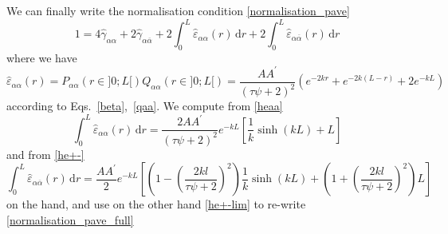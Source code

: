 \documentclass[pre,aps,superscriptaddress,nofootinbib]{revtex4}
\begin{document}
We can finally write the normalisation condition \eqref{normalisation_pave}
\begin{equation}
1 = 4 \hat{\gamma}_{\alpha\alpha} + 2 \hat{\gamma}_{\alpha\overline{\alpha}} + 2 \int_0^L \hat{\varepsilon}_{\alpha\alpha}(r) \, \mathrm{d}r + 2 \int_0^L \hat{\varepsilon}_{\alpha\overline{\alpha}}(r) \, \mathrm{d}r
\label{normalisation_pave_full}
\end{equation}
where we have
\begin{equation}
\hat{\varepsilon}_{\alpha\alpha}(r) = P_{\alpha\alpha}(r \in ]0; L[) Q_{\alpha\alpha}(r \in ]0; L[) = \frac{A A^{\prime}}{(\tau \psi + 2)^2} \left(e^{-2 k r} + e^{-2 k (L - r)} + 2 e^{-k L}\right)
\label{heaa}
\end{equation}
according to Eqs.~\ref{beta},~\ref{qaa}. We compute from \eqref{heaa}
\begin{equation}
\int_0^L \hat{\varepsilon}_{\alpha\alpha}(r) \, \mathrm{d}r = \frac{2 A A^{\prime}}{(\tau \psi + 2)^2} e^{-k L} \left[\frac{1}{k} \sinh(k L) + L\right]
\end{equation}
and from \eqref{he+-}
\begin{equation}
\int_0^L \hat{\varepsilon}_{\alpha\overline{\alpha}}(r) \, \mathrm{d}r = \frac{A A^{\prime}}{2} e^{-k L} \left[\left(1 - \left(\frac{2 k l}{\tau \psi + 2}\right)^2\right) \frac{1}{k} \sinh(k L) + \left(1 + \left(\frac{2 k l}{\tau \psi + 2}\right)^2\right) L\right]
\end{equation}
on the hand, and use on the other hand \eqref{he+-lim} to re-write \eqref{normalisation_pave_full}
\end{document}
